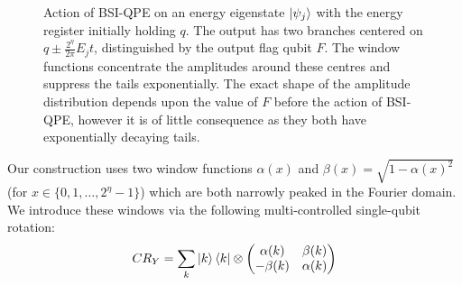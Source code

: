 \documentclass[aps,floatfix,10pt,amssymb,amsfont,amsmath,superscriptaddress,float,nofootinbib,longbibliography,nobalancelastpage,twocolumn]{revtex4-2}
\begin{document}
\begin{figure}
\begin{tikzpicture}
 
\end{tikzpicture}
\caption{Action of BSI-QPE on an energy eigenstate $\ket{\psi_j}$ with the energy register initially holding $q$. The output has two branches centered on $q\pm\frac{2^{\eta}}{2\pi}E_jt$, distinguished by the output flag qubit $F$. The window functions concentrate the amplitudes around these centres and suppress the tails exponentially. The exact shape of the amplitude distribution depends upon the value of $F$ before the action of BSI-QPE, however it is of little consequence as they both have exponentially decaying tails.}
\label{fig:Gshift}
\end{figure}

Our construction uses two window functions $\alpha(x)$ and $\beta(x) = \sqrt{1-\alpha(x)^2}$ (for $x\in\{0,1,\ldots,2^{\eta}-1\}$) which are both narrowly peaked in the Fourier domain. We introduce these windows via the following multi-controlled single-qubit rotation:
\begin{equation}
   CR_Y = \sum_k \ket{k}\bra{k}\otimes \begin{pmatrix}
        \alpha(k)& \beta(k)\\
        -\beta(k)& \alpha(k)
    \end{pmatrix}
\end{equation}
\end{document}
